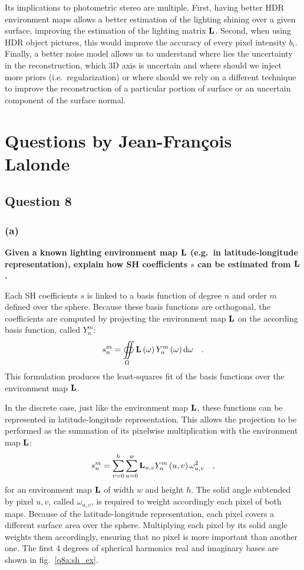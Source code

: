 \documentclass{report}
\begin{document}
Its implications to photometric stereo are multiple. First, having better HDR environment maps allows a better estimation of the lighting shining over a given surface, improving the estimation of the lighting matrix $\mathbf{L}$. Second, when using HDR object pictures, this would improve the accuracy of every pixel intensity $b_i$. Finally, a better noise model allows us to understand where lies the uncertainty in the reconstruction, which 3D axis is uncertain and where should we inject more priors (i.e.\ regularization) or where should we rely on a different technique to improve the reconstruction of a particular portion of surface or an uncertain component of the surface normal.

\chapter{Questions by Jean-François Lalonde}

\section{Question 8}
\subsection{(a)}
\textbf{Given a known lighting environment map $\mathbf{L}$ (e.g.\ in latitude-longitude representation), explain how SH coefficients $s$ can be estimated from $\mathbf{L}$.}

Each SH coefficients $s$ is linked to a basis function of degree $n$ and order $m$ defined over the sphere. Because these basis functions are orthogonal, the coefficients are computed by projecting the environment map $\mathbf{L}$ on the according basis function, called $Y_n^m$:
\begin{equation}
s_n^m = \oiint\limits_{\Omega} \mathbf{L}\left(\mathbf{\omega} \right) Y_n^m \left( \mathbf{\omega} \right) \mathrm{d} \mathbf{\omega}   \quad.
\end{equation}
This formulation produces the least-squares fit of the basis functions over the environment map $\mathbf{L}$.

In the discrete case, just like the environment map $\mathbf{L}$, these functions can be represented in latitude-longitude representation. This allows the projection to be performed as the summation of its pixelwise multiplication with the environment map $\mathbf{L}$:
\begin{equation}
s_n^m = \sum_{v=0}^{h} \sum_{u=0}^{w} \mathbf{L}_{u,v} Y_n^m\left(u, v\right) \omega_{u,v}^2 \quad,
\end{equation}
for an environment map $\mathbf{L}$ of width $w$ and height $h$. The solid angle subtended by pixel $u,v$, called $\omega_{u,v}$, is required to weight accordingly each pixel of both maps. Because of the latitude-longitude representation, each pixel covers a different surface area over the sphere. Multiplying each pixel by its solid angle weights them accordingly, ensuring that no pixel is more important than another one. The first 4 degrees of spherical harmonics real and imaginary bases are shown in fig.~\ref{q8a:sh_ex}.
\end{document}
